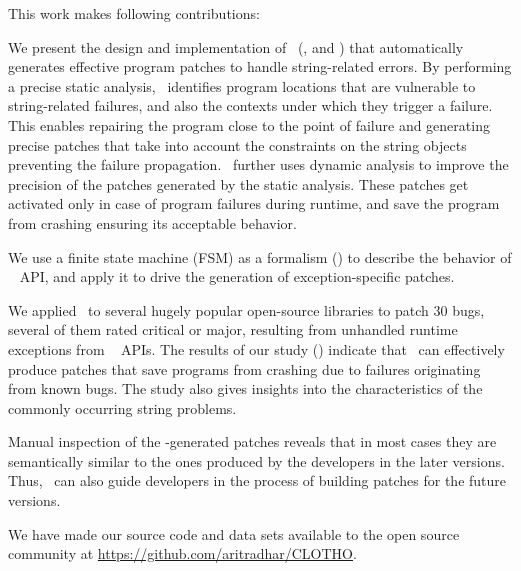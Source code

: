 This work makes following contributions:
\begin{mylist}

\item We present the design and implementation of \tool\ (,
 and ) that automatically generates effective
program patches to handle string-related errors.
By performing a precise static analysis, \tool\ identifies program locations that are
vulnerable to string-related failures, and also the contexts under which they trigger a failure.
This enables repairing the program close to the point of failure and
generating precise patches that take into account the constraints on the string objects
preventing the failure propagation. \tool\ further uses dynamic analysis to improve the precision
of the patches generated by the static analysis.
%
These patches get activated
only in case of program failures during runtime, and save the program from crashing
ensuring its acceptable behavior.

\item We use a finite state machine (FSM) as a formalism () to
describe the behavior of \java\  API, and apply it to drive the
generation of exception-specific patches.

\item We applied \tool\ to several hugely popular open-source libraries to patch
$30$ bugs, several of them rated critical or major, resulting from unhandled
runtime exceptions from \java\  APIs. The results of our study
() indicate that \tool\ can effectively produce patches that
save programs from crashing due to failures originating from known bugs. The
study also gives insights into the characteristics of the commonly occurring
string problems.

\item Manual inspection of the \tool-generated patches reveals that in most
cases they are semantically similar to the ones produced by the developers in
the later versions. %
Thus, \tool\ can also guide developers in the process of building patches for
the future versions.
\end{mylist}

We have made our source code and data sets available to the open source
community at \url{https://github.com/aritradhar/CLOTHO}.









